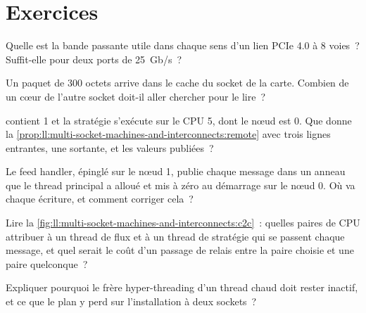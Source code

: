 \section{Exercices}

\begin{exercise}[$\star$]\label{exo:ll:multi-socket-machines-and-interconnects:1}
Quelle est la bande passante utile dans chaque sens d'un lien PCIe 4.0 à 8 voies~? Suffit-elle pour deux ports de 25~Gb/s~?
\end{exercise}

\begin{exercise}[$\star$]\label{exo:ll:multi-socket-machines-and-interconnects:2}
Un paquet de 300 octets arrive dans le cache du socket de la carte. Combien de  un cœur de l'autre socket doit-il aller chercher
pour le lire~?
\end{exercise}

\begin{exercise}[$\star$]\label{exo:ll:multi-socket-machines-and-interconnects:3}
 contient 1 et la stratégie s'exécute sur le CPU 5, dont le nœud est 0. Que
donne la \cref{prop:ll:multi-socket-machines-and-interconnects:remote} avec trois lignes entrantes, une sortante, et les
valeurs publiées~?
\end{exercise}

\begin{exercise}[$\star\star$]\label{exo:ll:multi-socket-machines-and-interconnects:4}
Le feed handler, épinglé sur le nœud 1, publie chaque message dans un anneau que le thread principal a alloué et mis à zéro au
démarrage sur le nœud 0. Où va chaque écriture, et comment corriger cela~?
\end{exercise}

\begin{exercise}[$\star\star$]\label{exo:ll:multi-socket-machines-and-interconnects:5}
Lire la \cref{fig:ll:multi-socket-machines-and-interconnects:c2c}~: quelles paires de CPU attribuer à un thread de flux et à un
thread de stratégie qui se passent chaque message, et quel serait le coût d'un passage de relais entre la paire choisie et une paire quelconque~?
\end{exercise}

\begin{exercise}[$\star\star$]\label{exo:ll:multi-socket-machines-and-interconnects:6}
Expliquer pourquoi le frère hyper-threading d'un thread chaud doit rester inactif, et ce que le plan y perd sur l'installation à deux sockets~?
\end{exercise}

